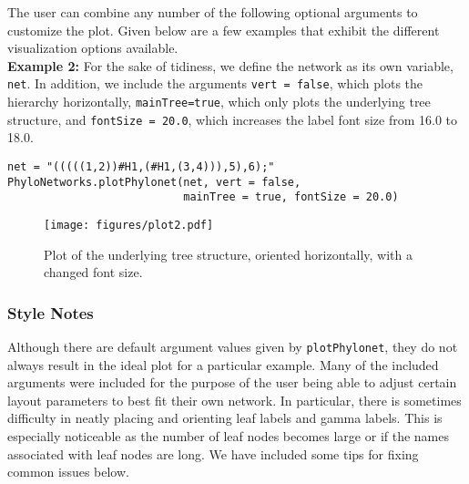 \documentclass[12pt]{article}
\begin{document}
\noindent The user can combine any number of the following optional arguments to
customize the plot.
Given below are a few examples that exhibit the different visualization options available. \\

\noindent \textbf{Example 2:} For the sake of tidiness, we define the network  as its own variable, \texttt{net}.
In addition, we include the arguments \texttt{vert = false}, which plots the hierarchy horizontally,
\texttt{mainTree=true}, which only plots the underlying tree structure, and
\texttt{fontSize = 20.0}, which increases the label font size from 16.0 to 18.0. \\

\begin{lstlisting}
net = "(((((1,2))#H1,(#H1,(3,4))),5),6);"
PhyloNetworks.plotPhylonet(net, vert = false,
                           mainTree = true, fontSize = 20.0)
\end{lstlisting}

\begin{figure}[htbp]
  \begin{center}
    \texttt{[image: figures/plot2.pdf]} \quad
    \caption{Plot of the underlying tree structure, oriented horizontally, with a changed font size.}
    \label{BasicPlot}
  \end{center}
\end{figure}


\subsubsection{Style Notes}
Although there are default argument values given by
\texttt{plotPhylonet}, they do not always result in the ideal plot for
a particular example.  Many of the included arguments were included
for the purpose of the user being able to adjust certain layout
parameters to best fit their own network.  In particular, there is
sometimes difficulty in neatly placing and orienting leaf labels and
gamma labels.  This is especially noticeable as the number of leaf
nodes becomes large or if the names associated with leaf nodes are
long.  We have included some tips for fixing common issues below.
\end{document}
